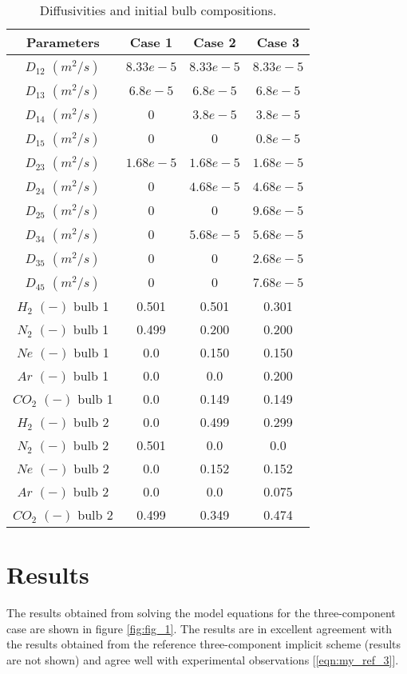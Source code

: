 \documentclass[11]{Report}
\begin{document}
    
\begin{table}[h!]
  \begin{center}
  \caption{Diffusivities and initial bulb compositions.}
    \label{tab:table1}
    \begin{tabular}{c|c|c|c} %
      \hline
      Parameters &      Case 1      &      Case 2      &      Case 3      \\
      \hline
      $D_{12}$ $(m^2 / s)$ & $8.33e-5$ & $8.33e-5$ & $8.33e-5$\\
      $D_{13}$ $(m^2 / s)$ & $6.8e-5$ & $6.8e-5$ & $6.8e-5$\\
      $D_{14}$ $(m^2 / s)$ & $0$ & $3.8e-5$ & $3.8e-5$\\
      $D_{15}$ $(m^2 / s)$ & $0$ & $0$ & $0.8e-5$ \\
      $D_{23}$ $(m^2 / s)$ & $1.68e-5$ & $1.68e-5$ & $1.68e-5$ \\
      $D_{24}$ $(m^2 / s)$ & $0$ & $4.68e-5$ & $4.68e-5$ \\
      $D_{25}$ $(m^2 / s)$ & $0$ & $0$ & $9.68e-5$ \\
      $D_{34}$ $(m^2 / s)$ & $0$ & $5.68e-5$ & $5.68e-5$ \\
      $D_{35}$ $(m^2 / s)$ & $0$ & $0$ & $2.68e-5$ \\
      $D_{45}$ $(m^2 / s)$ & $0$ & $0$ & $7.68e-5$ \\
      $H_2$ $(-)$ bulb 1 & 0.501 & 0.501 & 0.301 \\    
      $N_2$ $(-)$ bulb 1 & 0.499 & 0.200 & 0.200 \\      
      $Ne$ $(-)$ bulb 1 & 0.0 & 0.150 & 0.150 \\     
      $Ar$ $(-)$ bulb 1 & 0.0 & 0.0 & 0.200 \\
      $CO_2$ $(-)$ bulb 1 & 0.0 & 0.149 & 0.149 \\
      $H_2$ $(-)$ bulb 2 & 0.0 & 0.499 & 0.299 \\
      $N_2$ $(-)$ bulb 2 & 0.501 & 0.0 & 0.0 \\
      $Ne$ $(-)$ bulb 2 & 0.0 & 0.152 & 0.152 \\
      $Ar$ $(-)$ bulb 2 & 0.0 & 0.0 & 0.075 \\
      $CO_2$ $(-)$ bulb 2 & 0.499 & 0.349 & 0.474 \\         
      \hline
    \end{tabular}
  \end{center}
\end{table}

\section*{Results} 
The results obtained from solving the model equations for the three-component case are shown in figure \ref{fig:fig_1}. The results are in excellent agreement with the results obtained from the reference three-component implicit scheme (results are not shown) and agree well with experimental observations [\ref{eqn:my_ref_3}]. 
\end{document}
